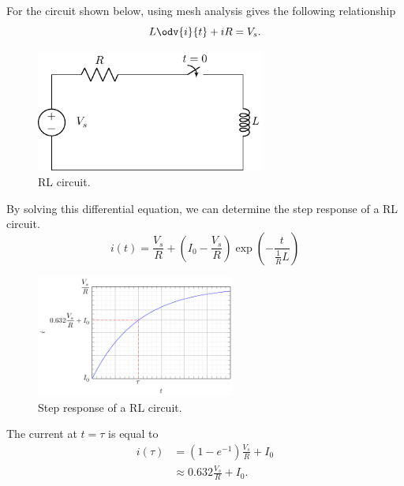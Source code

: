 \documentclass{article}
\begin{document}
\begin{definition}
    For the circuit shown below, using mesh analysis gives the following relationship
    \begin{equation*}
        L\odv{i}{t} + iR = V_s.
    \end{equation*}
    \begin{figure}[H]
        \centering
        \includegraphics[height = 4cm, keepaspectratio = true]{figures/rl_step.pdf}
        \caption{RL circuit.}
    \end{figure}
    By solving this differential equation, we can determine the step response of a
    RL circuit.
    \begin{equation*}
        i(t) = \frac{V_s}{R} + \left(I_0 - \frac{V_s}{R}\right)\exp{\left( -\frac{t}{\frac{1}{R}L} \right)}
    \end{equation*}
    \begin{figure}[H]
        \centering
        \includegraphics[height = 4cm, keepaspectratio = true]{figures/rl_step_plot.pdf}
        \caption{Step response of a RL circuit.}
    \end{figure}
    The current at \(t = \tau\) is equal to
    \begin{align*}
        i(\tau) & = \left( 1 - e^{-1} \right)\frac{V_s}{R} + I_0 \\
                & \approx 0.632\frac{V_s}{R} + I_0.
    \end{align*}
\end{definition}
\newpage
\end{document}

